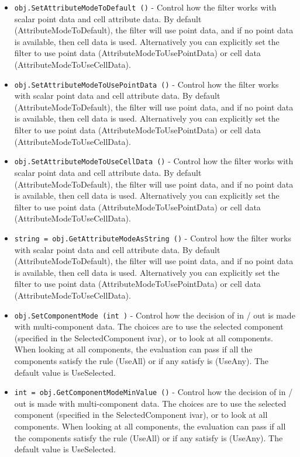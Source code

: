 \begin{itemize}
\item  \verb|obj.SetAttributeModeToDefault ()| -  Control how the filter works with scalar point data and cell attribute
 data.  By default (AttributeModeToDefault), the filter will use point
 data, and if no point data is available, then cell data is
 used. Alternatively you can explicitly set the filter to use point data
 (AttributeModeToUsePointData) or cell data (AttributeModeToUseCellData).

\item  \verb|obj.SetAttributeModeToUsePointData ()| -  Control how the filter works with scalar point data and cell attribute
 data.  By default (AttributeModeToDefault), the filter will use point
 data, and if no point data is available, then cell data is
 used. Alternatively you can explicitly set the filter to use point data
 (AttributeModeToUsePointData) or cell data (AttributeModeToUseCellData).

\item  \verb|obj.SetAttributeModeToUseCellData ()| -  Control how the filter works with scalar point data and cell attribute
 data.  By default (AttributeModeToDefault), the filter will use point
 data, and if no point data is available, then cell data is
 used. Alternatively you can explicitly set the filter to use point data
 (AttributeModeToUsePointData) or cell data (AttributeModeToUseCellData).

\item  \verb|string = obj.GetAttributeModeAsString ()| -  Control how the filter works with scalar point data and cell attribute
 data.  By default (AttributeModeToDefault), the filter will use point
 data, and if no point data is available, then cell data is
 used. Alternatively you can explicitly set the filter to use point data
 (AttributeModeToUsePointData) or cell data (AttributeModeToUseCellData).

\item  \verb|obj.SetComponentMode (int )| -  Control how the decision of in / out is made with multi-component data.
 The choices are to use the selected component (specified in the
 SelectedComponent ivar), or to look at all components. When looking at
 all components, the evaluation can pass if all the components satisfy
 the rule (UseAll) or if any satisfy is (UseAny). The default value is
 UseSelected.

\item  \verb|int = obj.GetComponentModeMinValue ()| -  Control how the decision of in / out is made with multi-component data.
 The choices are to use the selected component (specified in the
 SelectedComponent ivar), or to look at all components. When looking at
 all components, the evaluation can pass if all the components satisfy
 the rule (UseAll) or if any satisfy is (UseAny). The default value is
 UseSelected.


\end{itemize}
